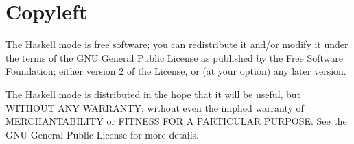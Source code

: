 \documentclass[a4paper]{article}
\begin{document}
\section{Copyleft}

The Haskell mode is free software; you can redistribute it and/or modify it
under the terms of the GNU General Public License as published by the Free
Software Foundation; either version 2 of the License, or (at your option) any
later version.

The Haskell mode is distributed in the hope that it will be useful, but
WITHOUT ANY WARRANTY; without even the implied warranty of MERCHANTABILITY or
FITNESS FOR A PARTICULAR PURPOSE.  See the GNU General Public License for more
details.



\end{document}
